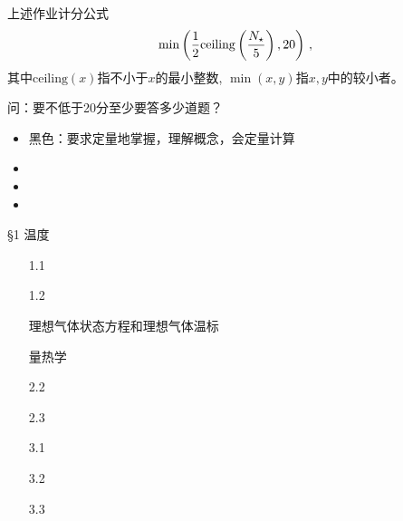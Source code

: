 \documentclass[CJK]{beamer}
\begin{document}
\begin{frame}
\bch
上述作业计分公式
$$ \min\left( \frac{1}{2}{\rm ceiling}\left(\frac{N_\star}{5}\right), 20\right) \, , $$
其中$\mathrm{ceiling}(x)$指不小于$x$的最小整数, $\min(x, y)$指$x, y$中的较小者。

\skipline

问：要不低于20分至少要答多少道题？

\ech
\end{frame}

\begin{frame}
\bch

\begin{itemize}
\item{黑色：要求定量地掌握，理解概念，会定量计算}
\item{}
\item{}
\item{}
\end{itemize}

\ech
\end{frame}


\begin{frame}
\bch
\S{1}  温度
\begin{itemize}
\item[1.1]{}
\item[1.2]{}
\item[\blacktext{1.3}]{理想气体状态方程和理想气体温标}
\item[\greentext{1.4}]{}
\end{itemize}
\begin{itemize}
\item[\blacktext{2.1}]{量热学 }
\item[2.2]{}
\item[2.3]{}
\end{itemize}

\begin{itemize}
\item[3.1]{}
\item[3.2]{}
\item[3.3]{}
\end{itemize}

\ech
\end{frame}
\end{document}
